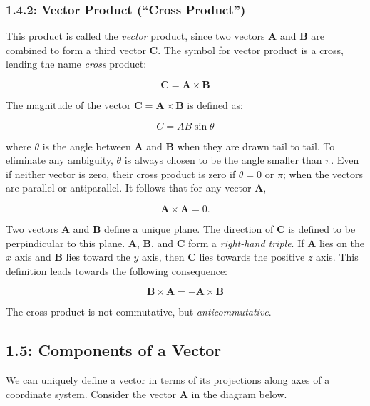 \documentclass[12pt,twoside]{article}
\begin{document}
\begin{flushleft}
\subsubsection*{1.4.2: Vector Product (``Cross Product'')}

This product is called the \textit{vector} product, since two vectors $\mathbf{A}$ and $\mathbf{B}$ are combined to form a third vector $\mathbf{C}$.
The symbol for vector product is a cross, lending the name \textit{cross} product:

$$
\mathbf{C} = \mathbf{A} \times \mathbf{B}
$$

The magnitude of the vector $\mathbf{C} = \mathbf{A} \times \mathbf{B}$ is defined as:

$$
\mathit{C} = \mathit{A}\mathit{B}\sin{\theta}
$$

where $\theta$ is the angle between $\mathbf{A}$ and $\mathbf{B}$ when they are drawn tail to tail. To eliminate any ambiguity, $\theta$ is always
chosen to be the angle smaller than $\pi$. Even if neither vector is zero, their cross product is zero if $\theta = 0$ or $\pi$; when the vectors are parallel
or antiparallel. It follows that for any vector $\mathbf{A}$,

$$
\mathbf{A} \times \mathbf{A} = 0.
$$

Two vectors $\mathbf{A}$ and $\mathbf{B}$ define a unique plane. The direction of $\mathbf{C}$ is defined to be perpindicular to this plane. $\mathbf{A}$, $\mathbf{B}$, and $\mathbf{C}$ form a \textit{right-hand triple}. If $\mathbf{A}$ lies on the $\mathit{x}$ axis and $\mathbf{B}$ lies toward the $\mathit{y}$ axis, then
$\mathbf{C}$ lies towards the positive $\mathit{z}$ axis. This definition leads towards the following consequence:

$$
\mathbf{B} \times \mathbf{A} = -\mathbf{A} \times \mathbf{B}
$$

The cross product is not commutative, but \textit{anticommutative}.

\subsection*{1.5: Components of a Vector}

We can uniquely define a vector in terms of its projections along axes of a coordinate system. Consider the vector $\mathbf{A}$ in the diagram below.


\end{flushleft}
\end{document}
